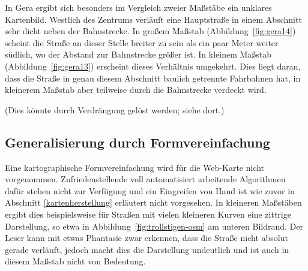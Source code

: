 \documentclass[../main/thesis.tex]{subfiles}
\begin{document}
In Gera ergibt sich besonders im Vergleich zweier Maßstäbe ein unklares Kartenbild.
Westlich des Zentrums verläuft eine Hauptstraße in einem Abschnitt sehr dicht neben der Bahnstrecke.
In großem Maßstab (Abbildung~\ref{fig:gera14}) scheint die Straße an dieser Stelle breiter zu sein als ein paar Meter weiter südlich, wo der Abstand zur Bahnstrecke größer ist.
In kleinem Maßstab (Abbildung~\ref{fig:gera13}) erscheint dieses Verhältnis umgekehrt.
Dies liegt daran, dass die Straße in genau diesem Abschnitt baulich getrennte Fahrbahnen hat, in kleinerem Maßstab aber teilweise durch die Bahnstrecke verdeckt wird.

(Dies könnte durch Verdrängung gelöst werden; siehe dort.)




\subsection{Generalisierung durch Formvereinfachung}

Eine kartographische Formvereinfachung wird für die Web-Karte nicht vorgenommen.
Zufriedenstellende voll automatisiert arbeitende Algorithmen dafür stehen nicht zur Verfügung und ein Eingreifen von Hand ist wie zuvor in Abschnitt \ref{kartenherstellung} erläutert nicht vorgesehen. 
In kleineren Maßstäben ergibt dies beispielsweise für Straßen mit vielen kleineren Kurven eine zittrige Darstellung, so etwa in Abbildung~\ref{fig:trollstigen-osm} am unteren Bildrand.
Der Leser kann mit etwas Phantasie zwar erkennen, dass die Straße nicht absolut gerade verläuft, jedoch macht dies die Darstellung undeutlich und ist auch in diesem Maßstab nicht von Bedeutung.
\end{document}
